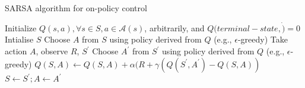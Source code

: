 \bgroup
\begin{frame}{SARSA algorithm for on-policy control}
\begin{algorithmic}
\STATE Initialize $Q(s,a), \forall s \in S, a \in \mathcal{A}(s)$, arbitrarily, and $Q(terminal-state, \dot)=0$
\STATE Intialise $S$
\STATE Choose $A$ from $S$ using policy derived from $Q$ (e.g., $\epsilon$-greedy)
\STATE Take action $A$, observe $R$, $S^{\prime}$
\STATE Choose $A^{\prime}$ from $S^{\prime}$ using policy derived from $Q$ (e.g., $\epsilon$-greedy)
\STATE $Q(S,A) \leftarrow Q(S,A) + \alpha (R + \gamma (Q(S^{\prime}, A^{\prime}) - Q(S,A))$
\STATE $S \leftarrow S^{\prime}; A \leftarrow A^{\prime}$
\ENDFOR
\ENDFOR
\end{algorithmic}
\end{frame}
\egroup